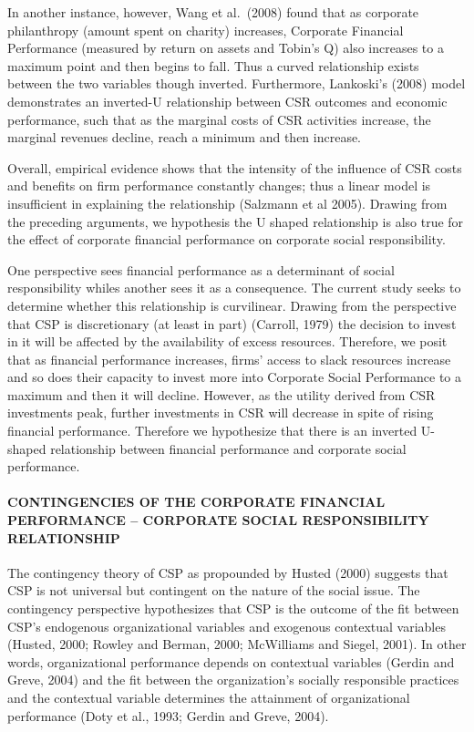 \documentclass[
]{mitthesis}
\begin{document}
In another instance, however, Wang et al.~(2008) found that as corporate philanthropy (amount spent on charity) increases, Corporate Financial Performance (measured by return on assets and Tobin's Q) also increases to a maximum point and then begins to fall. Thus a curved relationship exists between the two variables though inverted. Furthermore, Lankoski's (2008) model demonstrates an inverted-U relationship between CSR outcomes and economic performance, such that as the marginal costs of CSR activities increase, the marginal revenues decline, reach a minimum and then increase.

Overall, empirical evidence shows that the intensity of the influence of CSR costs and benefits on firm performance constantly changes; thus a linear model is insufficient in explaining the relationship (Salzmann et al 2005). Drawing from the preceding arguments, we hypothesis the U shaped relationship is also true for the effect of corporate financial performance on corporate social responsibility.

One perspective sees financial performance as a determinant of social responsibility whiles another sees it as a consequence. The current study seeks to determine whether this relationship is curvilinear. Drawing from the perspective that CSP is discretionary (at least in part) (Carroll, 1979) the decision to invest in it will be affected by the availability of excess resources. Therefore, we posit that as financial performance increases, firms' access to slack resources increase and so does their capacity to invest more into Corporate Social Performance to a maximum and then it will decline. However, as the utility derived from CSR investments peak, further investments in CSR will decrease in spite of rising financial performance. Therefore we hypothesize that there is an inverted U-shaped relationship between financial performance and corporate social performance.

\hypertarget{contingencies-of-the-corporate-financial-performance-corporate-social-responsibility-relationship}{%
\paragraph{CONTINGENCIES OF THE CORPORATE FINANCIAL PERFORMANCE -- CORPORATE SOCIAL RESPONSIBILITY RELATIONSHIP}\label{contingencies-of-the-corporate-financial-performance-corporate-social-responsibility-relationship}}

The contingency theory of CSP as propounded by Husted (2000) suggests that CSP is not universal but contingent on the nature of the social issue. The contingency perspective hypothesizes that CSP is the outcome of the fit between CSP's endogenous organizational variables and exogenous contextual variables (Husted, 2000; Rowley and Berman, 2000; McWilliams and Siegel, 2001). In other words, organizational performance depends on contextual variables (Gerdin and Greve, 2004) and the fit between the organization's socially responsible practices and the contextual variable determines the attainment of organizational performance (Doty et al., 1993; Gerdin and Greve, 2004).
\end{document}
